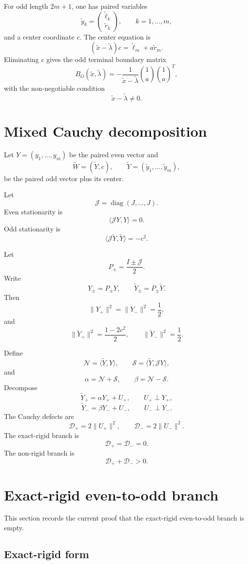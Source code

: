 \documentclass[11pt]{article}
\numberwithin{equation}{section}
\begin{document}
For odd length \(2m+1\), one has paired variables
\[
\widetilde y_k=
\binom{\widetilde\ell_k}{\widetilde r_k},
\qquad k=1,\dots,m,
\]
and a center coordinate \(c\). The center equation is
\[
(\widetilde x-\widetilde\lambda)c
=
\widetilde\ell_m+a\widetilde r_m.
\]
Eliminating \(c\) gives the odd terminal boundary matrix
\[
B_O(\widetilde x,\widetilde\lambda)
=
-\frac{1}{\widetilde x-\widetilde\lambda}
\binom{1}{a}\binom{1}{a}^T,
\]
with the non-negotiable condition
\[
\widetilde x-\widetilde\lambda\ne0.
\]

\section{Mixed Cauchy decomposition}

Let \(Y=(y_1,\dots,y_m)\) be the paired even vector and
\[
\widetilde W=(\widetilde Y,c),
\qquad
\widetilde Y=(\widetilde y_1,\dots,\widetilde y_m),
\]
be the paired odd vector plus its center.

Let
\[
\mathcal J=\operatorname{diag}(J,\dots,J).
\]
Even stationarity is
\[
\langle \mathcal JY,Y\rangle=0.
\]
Odd stationarity is
\[
\langle \mathcal J\widetilde Y,\widetilde Y\rangle=-c^2.
\]

Let
\[
P_\pm=\frac{I\pm\mathcal J}{2}.
\]
Write
\[
Y_\pm=P_\pm Y,
\qquad
\widetilde Y_\pm=P_\pm\widetilde Y.
\]
Then
\[
\|Y_+\|^2=\|Y_-\|^2=\frac12,
\]
and
\[
\|\widetilde Y_+\|^2=\frac{1-2c^2}{2},
\qquad
\|\widetilde Y_-\|^2=\frac12.
\]

Define
\[
\mathcal N=\langle \widetilde Y,Y\rangle,
\qquad
\mathcal S=\langle \widetilde Y,\mathcal JY\rangle,
\]
and
\[
\alpha=\mathcal N+\mathcal S,
\qquad
\beta=\mathcal N-\mathcal S.
\]
Decompose
\[
\widetilde Y_+=\alpha Y_+ + U_+,
\qquad
U_+\perp Y_+,
\]
\[
\widetilde Y_-=\beta Y_- + U_-,
\qquad
U_-\perp Y_-.
\]
The Cauchy defects are
\[
\mathcal D_+=2\|U_+\|^2,
\qquad
\mathcal D_-=2\|U_-\|^2.
\]
The exact-rigid branch is
\[
\mathcal D_+=\mathcal D_-=0.
\]
The non-rigid branch is
\[
\mathcal D_++\mathcal D_->0.
\]

\section{Exact-rigid even-to-odd branch}

This section records the current proof that the exact-rigid even-to-odd branch is
empty.

\subsection{Exact-rigid form}
\end{document}

